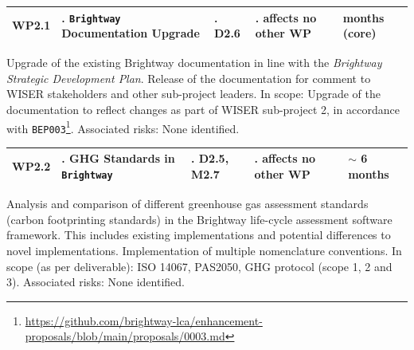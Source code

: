 \documentclass{article}
\begin{document}
    \begin{table}[H]
        \centering
        \begin{tabularx}{\linewidth}{
            |>{\hsize=0.25\hsize}X
            |>{\hsize=1.\hsize}X
            |>{\hsize=1.\hsize}X
            |>{\hsize=1.\hsize}X
            |>{\hsize=0.75\hsize}X|
          } %
            \hline
                WP2.1
            &
                \texttt{Brightway} Documentation Upgrade
            &
                D2.6
            &
                affects no other WP
            &
                3 months (core)
            \\
            \hline
        \end{tabularx}
    \end{table}
    \vspace*{-9pt}
    
    Upgrade of the existing Brightway documentation in line with the \textit{Brightway Strategic Development Plan}. Release of the documentation for comment to WISER stakeholders and other sub-project leaders. In scope: Upgrade of the documentation to reflect changes as part of WISER sub-project 2, in accordance with \texttt{BEP003}\footnote{\url{https://github.com/brightway-lca/enhancement-proposals/blob/main/proposals/0003.md}}. Associated risks: None identified.
    
    \begin{table}[H]
        \centering
        \begin{tabularx}{\linewidth}{
            |>{\hsize=0.25\hsize}X
            |>{\hsize=1.\hsize}X
            |>{\hsize=1.\hsize}X
            |>{\hsize=1.\hsize}X
            |>{\hsize=0.75\hsize}X|
          } %
            \hline
                WP2.2
            &
                GHG Standards in \texttt{Brightway}
            &
                D2.5, M2.7
            &
                affects no other WP
            &
                $\sim$ 6 months
            \\
            \hline
        \end{tabularx}
    \end{table}
    \vspace*{-9pt}
    
    Analysis and comparison of different greenhouse gas assessment standards (carbon footprinting standards) in the Brightway life-cycle assessment software framework. This includes existing implementations and potential differences to novel implementations. Implementation of multiple nomenclature conventions. In scope (as per deliverable): ISO 14067, PAS2050, GHG protocol (scope 1, 2 and 3). Associated risks: None identified.
    
\end{document}
